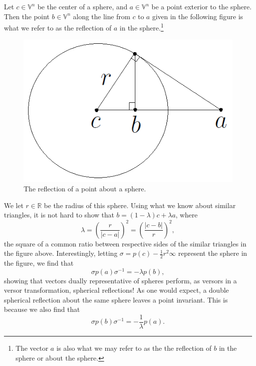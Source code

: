 \documentclass[12pt]{article}
\newcommand{\V}{\mathbb{V}}
\newcommand{\R}{\mathbb{R}}
\newcommand{\nvai}{\infty}
\begin{document}
Let $c\in\V^n$ be the center of a sphere, and $a\in\V^n$ be a point
exterior to the sphere.  Then the point $b\in\V^n$ along the line
from $c$ to $a$ given in the following figure is what we refer to
as the reflection of $a$ in the sphere.\footnote{The vector $a$ is
also what we may refer to as the the reflection of $b$ in the sphere or about the sphere.}
\begin{figure}[H]\label{fig_spherical_reflection}
\centering
\includegraphics[scale=0.3]{SphericalReflectionFigure}
\caption{The reflection of a point about a sphere.}
\end{figure}
We let $r\in\R$ be the radius of this sphere.  Using what we know about similar
triangles, it is not hard to show that $b = (1-\lambda)c + \lambda a$,
where
\begin{equation*}
\lambda = \left(\frac{r}{|c-a|}\right)^2 = \left(\frac{|c-b|}{r}\right)^2,
\end{equation*}
the square of a common ratio between respective sides of the
similar triangles in the figure above.
Interestingly, letting $\sigma=p(c)-\frac{1}{2}r^2\nvai$ represent the sphere in the figure, we find that
\begin{equation*}
\sigma p(a)\sigma^{-1} = -\lambda p(b),
\end{equation*}
showing that vectors dually
representative of spheres perform, as versors in a versor transformation, spherical reflections!
As one would expect, a double spherical reflection about the same sphere leaves a point
invariant.  This is because we also find that
\begin{equation*}
\sigma p(b)\sigma^{-1} = -\frac{1}{\lambda}p(a).
\end{equation*}
\end{document}
